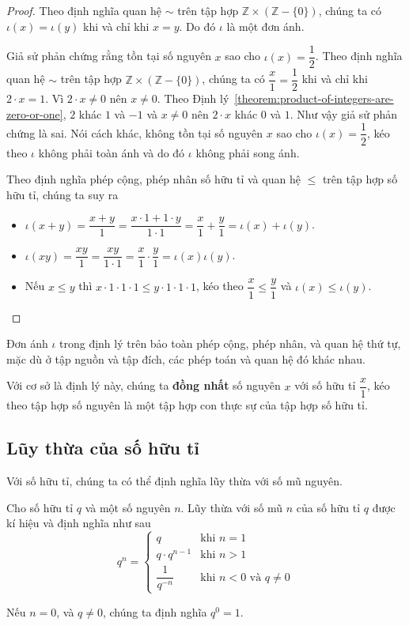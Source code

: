 \begin{proof}
    Theo định nghĩa quan hệ $\sim$ trên tập hợp $\mathbb{Z}\times (\mathbb{Z} - \{0\})$, chúng ta có $\iota(x) = \iota(y)$ khi và chỉ khi $x = y$. Do đó $\iota$ là một đơn ánh.

    Giả sử phản chứng rằng tồn tại số nguyên $x$ sao cho $\iota(x) = \dfrac{1}{2}$. Theo định nghĩa quan hệ $\sim$ trên tập hợp $\mathbb{Z}\times (\mathbb{Z} - \{0\})$, chúng ta có $\dfrac{x}{1} = \dfrac{1}{2}$ khi và chỉ khi $2\cdot x = 1$. Vì $2\cdot x\ne 0$ nên $x\ne 0$. Theo Định lý~\ref{theorem:product-of-integers-are-zero-or-one}, $2$ khác $1$ và $-1$ và $x\ne 0$ nên $2\cdot x$ khác $0$ và $1$. Như vậy giả sử phản chứng là sai. Nói cách khác, không tồn tại số nguyên $x$ sao cho $\iota(x) = \dfrac{1}{2}$, kéo theo $\iota$ không phải toàn ánh và do đó $\iota$ không phải song ánh.

    Theo định nghĩa phép cộng, phép nhân số hữu tỉ và quan hệ $\leq$ trên tập hợp số hữu tỉ, chúng ta suy ra
    \begin{itemize}
        \item $\iota(x + y) = \dfrac{x + y}{1} = \dfrac{x\cdot 1 + 1\cdot y}{1\cdot 1} = \dfrac{x}{1} + \dfrac{y}{1} = \iota(x) + \iota(y)$.
        \item $\iota(xy) = \dfrac{xy}{1} = \dfrac{xy}{1\cdot 1} = \dfrac{x}{1}\cdot\dfrac{y}{1} = \iota(x)\iota(y)$.
        \item Nếu $x\leq y$ thì $x\cdot 1\cdot 1\cdot 1\leq y\cdot 1\cdot 1\cdot 1$, kéo theo $\dfrac{x}{1}\leq \dfrac{y}{1}$ và $\iota(x)\leq \iota(y)$.
    \end{itemize}
\end{proof}

Đơn ánh $\iota$ trong định lý trên bảo toàn phép cộng, phép nhân, và quan hệ thứ tự, mặc dù ở tập nguồn và tập đích, các phép toán và quan hệ đó khác nhau.

Với cơ sở là định lý này, chúng ta \textbf{đồng nhất} số nguyên $x$ với số hữu tỉ $\dfrac{x}{1}$, kéo theo tập hợp số nguyên là một tập hợp con thực sự của tập hợp số hữu tỉ.

\subsection{Lũy thừa của số hữu tỉ}

Với số hữu tỉ, chúng ta có thể định nghĩa lũy thừa với số mũ nguyên.

\begin{definition}
    Cho số hữu tỉ $q$ và một số nguyên $n$. Lũy thừa với số mũ $n$ của số hữu tỉ $q$ được kí hiệu và định nghĩa như sau
    \[
        q^{n} =
        \begin{cases}
            q                 & \text{khi $n = 1$}             \\
            q\cdot q^{n-1}    & \text{khi $n > 1$}             \\
            \dfrac{1}{q^{-n}} & \text{khi $n < 0$ và $q\ne 0$}
        \end{cases}
    \]

    Nếu $n = 0$, và $q\ne 0$, chúng ta định nghĩa $q^{0} = 1$.
\end{definition}


